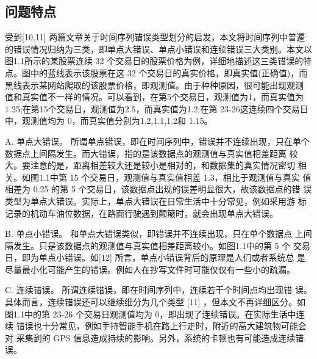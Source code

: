 \documentclass{article}
\begin{document}
\subsection{问题特点}
受到[10,11] 两篇文章关于时间序列错误类型划分的启发，本文将时间序列中普遍的错误情况归纳为三类，即单点大错误、单点小错误和连续错误三大类别。本文以图1.1所示的某股票连续 32 个交易日的股票价格为例，详细地描述这三类错误的特点。图中的蓝线表示该股票在这 32 个交易日的真实价格，即真实值(正确值)，而黑线表示某网站爬取的该股票价格，即观测值。由于种种原因，很可能出现观测 值和真实值不一样的情况。可以看到，在第5个交易日，观测值为1，而真实值为1.25;在第15个交易日，观测值为2.5，而真实值为1.2;在第 23-26这连续四个交易日中，观测值均为 0，而真实值分别为1.2,1.1,1.2和 1.15。
\par A. 单点大错误。 所谓单点错误，即在时间序列中，错误并不连续出现，只在单个数据点上间隔发生。而大错误，指的是该数据点的观测值与真实值相差距离 较大。要注意的是，距离相差较大还是较小是相对的，和数据集的真实情况密切 相关。如图1.1中第 15 个交易日，观测值与真实值相差 1.3，相比于观测值与真实 值相差为 0.25 的第 5 个交易日，该数据点出现的误差明显很大，故该数据点的错 误类型为单点大错误。实际上，单点大错误在日常生活中十分常见，例如采用游 标记录的机动车油位数据，在路面行驶遇到颠簸时，就会出现单点大错误。 
\par B. 单点小错误。 和单点大错误类似，即错误并不连续出现，只在单个数据点 上间隔发生。只是该数据点的观测值与真实值相差距离较小。如图1.1中的第 5 个 交易日，即为单点小错误。如[12] 所言，单点小错误背后的原理是人们或者系统总 是尽量最小化可能产生的错误。例如人在抄写文件时可能仅仅有一些小的疏漏。 
\par C. 连续错误。 所谓连续错误，即在时间序列中，连续若干个时间点均出现错 误。具体而言，连续错误还可以继续细分为几个类型 [11] ，但本文不再详细区分。如 图1.1中的第 23-26 个交易日观测值均为 0，即出现了连续错误。在实际生活中连续 错误也十分常见，例如手持智能手机在路上行走时，附近的高大建筑物可能会对 采集到的 GPS 信息造成持续的影响。另外，系统的卡顿也有可能造成连续错误。 
\end{document}
